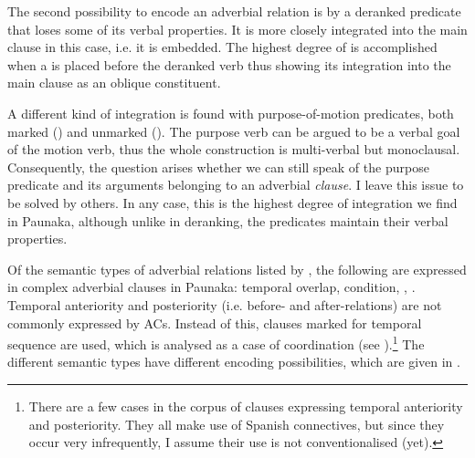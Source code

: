 The second possibility to encode an adverbial relation is by a deranked predicate that loses some of its verbal properties. It is more closely integrated into the main clause in this case, i.e. it is embedded. The highest degree of  is accomplished when a  is placed before the deranked verb thus showing its integration into the main clause as an oblique constituent.

A different kind of integration is found with purpose-of-motion predicates, both marked () and unmarked (). The purpose verb can be argued to be a verbal goal  of the motion verb, thus the whole construction is multi-verbal but monoclausal. Consequently, the question arises whether we can still speak of the purpose predicate and its arguments belonging to an adverbial \textit{clause}. I leave this issue to be solved by others. In any case, this is the highest degree of integration we find in Paunaka, although unlike in deranking, the predicates maintain their verbal properties.

Of the semantic types of adverbial relations listed by \citet[156]{Cristofaro2003}, the following are expressed in complex adverbial clauses in Paunaka: temporal overlap, condition, , . Temporal anteriority and posteriority (i.e. before- and after-relations) are not commonly expressed by ACs. Instead of this, clauses marked for temporal sequence are used, which is analysed as a case of coordination (see ).\footnote{There are a few cases in the corpus of clauses expressing temporal anteriority and posteriority. They all make use of Spanish connectives, but since they occur very infrequently, I assume their use is not conventionalised (yet).} The different semantic types have different encoding possibilities, which are given in . 


